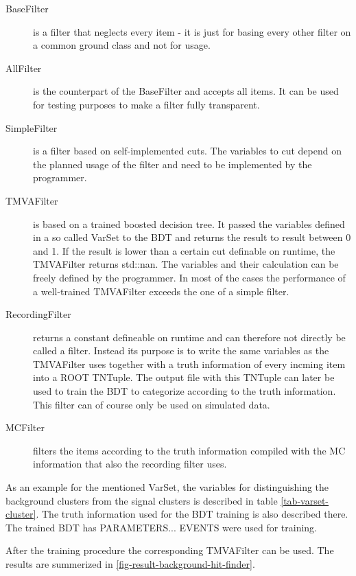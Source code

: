 \begin{description}
  \item[BaseFilter] is a filter that neglects every item - it is just for basing every other filter on a common ground class and not for usage.
  \item[AllFilter] is the counterpart of the BaseFilter and accepts all items. It can be used for testing purposes to make a filter fully transparent.
  \item[SimpleFilter] is a filter based on self-implemented cuts. The variables to cut depend on the planned usage of the filter and need to be implemented by the programmer.
  \item[TMVAFilter] is based on a trained boosted decision tree. It passed the variables defined in a so called VarSet to the BDT and returns the result to result between 0 and 1. If the result is lower than a certain cut definable on runtime, the TMVAFilter returns std::nan. The variables and their calculation can be freely defined by the programmer. In most of the cases the performance of a well-trained TMVAFilter exceeds the one of a simple filter.
  \item[RecordingFilter] returns a constant defineable on runtime and can therefore not directly be called a filter. Instead its purpose is to write the same variables as the TMVAFilter uses together with a truth information of every incming item into a ROOT TNTuple. The output file with this TNTuple can later be used to train the BDT to categorize according to the truth information. This filter can of course only be used on simulated data.
  \item[MCFilter] filters the items according to the truth information compiled with the MC information that also the recording filter uses. 
\end{description}

As an example for the mentioned VarSet, the variables for distinguishing the background clusters from the signal clusters is described in table \ref{tab-varset-cluster}. The truth information used for the BDT training is also described there. The trained BDT has PARAMETERS... EVENTS were used for training. 

\begin{table}
  \caption{}
  \label{tab-varset-cluster}
\end{table}


After the training procedure the corresponding TMVAFilter can be used. The results are summerized in \ref{fig-result-background-hit-finder}. 

